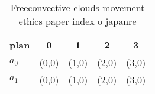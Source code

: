 \documentclass[a4paper]{article}
\begin{document}
\begin{table}
\begin{adjustbox}{width=0.6\columnwidth}
\begin{tabular}{|l|l|l|l|l|}
\hline
\textbf{plan} & \multicolumn{1}{c|}{\textbf{0}} & \multicolumn{1}{c|}{\textbf{1}} & \multicolumn{1}{c|}{\textbf{2}} & \multicolumn{1}{c|}{\textbf{3}} \\ \hline
\textbf{$a_0$}  & (0,0) & (1,0) & (2,0) & (3,0) \\ \hline
\textbf{$a_1$}  & (0,0) & (1,0) & (2,0) & (3,0) \\ \hline
\end{tabular}
\end{adjustbox}
\caption{Freeconvective clouds movement ethics paper index o japanre
}
\end{table}
\end{document}
